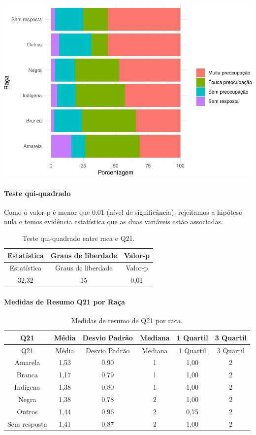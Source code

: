 \documentclass[]{article}
\let\oldparagraph\paragraph
\renewcommand{\paragraph}[1]{\oldparagraph{#1}\mbox{}}
\begin{document}
\begin{center}\includegraphics[width=0.75\linewidth]{relatorio_covid19_files/figure-latex/unnamed-chunk-457-1} \end{center}

\hypertarget{teste-qui-quadrado-40}{%
\paragraph{Teste qui-quadrado}\label{teste-qui-quadrado-40}}

Como o valor-p é menor que 0.01 (nível de significância), rejeitamos a hipótese nula e temos evidência estatística que as duas variáveis estão associadas.

\begin{longtable}[]{@{}ccc@{}}
\caption{\label{tab:unnamed-chunk-459}Teste qui-quadrado entre raca e Q21.}\tabularnewline
\toprule
Estatística & Graus de liberdade & Valor-p\tabularnewline
\midrule
\endfirsthead
\toprule
Estatística & Graus de liberdade & Valor-p\tabularnewline
\midrule
\endhead
32,32 & 15 & 0,01\tabularnewline
\bottomrule
\end{longtable}

\cleardoublepage

\hypertarget{medidas-de-resumo-q21-por-rauxe7a}{%
\paragraph{Medidas de Resumo Q21 por Raça}\label{medidas-de-resumo-q21-por-rauxe7a}}

\begin{longtable}[]{@{}cccccc@{}}
\caption{\label{tab:unnamed-chunk-460}Medidas de resumo de Q21 por raca.}\tabularnewline
\toprule
Q21 & Média & Desvio Padrão & Mediana & 1 Quartil & 3 Quartil\tabularnewline
\midrule
\endfirsthead
\toprule
Q21 & Média & Desvio Padrão & Mediana & 1 Quartil & 3 Quartil\tabularnewline
\midrule
\endhead
Amarela & 1,53 & 0,90 & 1 & 1,00 & 2\tabularnewline
Branca & 1,17 & 0,79 & 1 & 1,00 & 2\tabularnewline
Indígena & 1,38 & 0,80 & 1 & 1,00 & 2\tabularnewline
Negra & 1,38 & 0,78 & 2 & 1,00 & 2\tabularnewline
Outros & 1,44 & 0,96 & 2 & 0,75 & 2\tabularnewline
Sem resposta & 1,41 & 0,87 & 2 & 1,00 & 2\tabularnewline
\bottomrule
\end{longtable}
\end{document}
